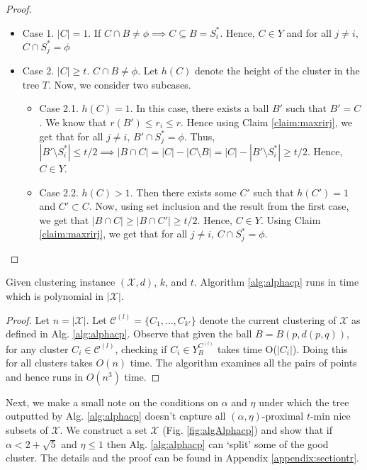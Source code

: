\documentclass[anon,12pt]{colt2016} %
\newcommand{\mc}{\mathcal}
\begin{document}
\begin{proof}
\begin{itemize}[nolistsep]
\item Case 1. $|C| = 1$. If $C \cap B \neq \phi \implies C \subseteq B = S_i^*$. Hence, $C \in Y$ and for all $j \neq i$, $C \cap S_j^* = \phi$

\item Case 2. $|C|\ge t$. $C \cap B \neq \phi$. Let $h(C)$ denote the height of the cluster in the tree $T$. Now, we consider two subcases.
\begin{itemize}
\renewcommand\labelitemii{$\circ$}
\item Case 2.1. $h(C) = 1$. In this case, there exists a ball $B'$ such that $B' = C$. We know that $r(B') \le r_i \le r$. Hence using Claim \ref{claim:maxrirj}, we get that for all $j \neq i$, $B' \cap S_j^* = \phi$. Thus, $|B'\setminus S_i^*| \le t/2 \implies |B\cap C| = |C| - |C\setminus B| = |C| - |B'\setminus S_i^*| \ge t/2$. Hence, $C \in Y$.

\item Case 2.2. $h(C) > 1$. Then there exists some $C'$ such that $h(C') = 1$ and $C' \subset C$. Now, using set inclusion and the result from the first case, we get that $|B\cap C| \ge |B\cap C'| \ge t/2$. Hence, $C \in Y$. Using Claim \ref{claim:maxrirj}, we get that for all $j \neq i$, $C \cap S_j^* = \phi$.
\end{itemize} 
\end{itemize}
\end{proof}

\begin{theorem}
\label{thm:algcptime}
Given clustering instance $(\mc X, d)$, $k$, and $t$. Algorithm \ref{alg:alphacp} runs in time which is polynomial in $|\mc X|$.
\end{theorem}

\begin{proof}
Let $n = |\mc X|$. Let $\mc C^{(l)} =\{C_1, \ldots, C_{k'}\}$ denote the current clustering of $\mc X$ as defined in Alg. \ref{alg:alphacp}. Observe that given the ball $B = B(p, d(p, q))$, for any cluster $C_i \in \mc C^{(l)}$, checking if $C_i \in Y_B^{C^{(l)}}$ takes time O($|C_i|$). Doing this for all clusters takes $O(n)$ time. The algorithm examines all the pairs of points and hence runs in $O(n^3)$ time.
\end{proof}

Next, we make a small note on the conditions on $\alpha$ and $\eta$ under which the tree outputted by Alg. \ref{alg:alphacp} doesn't capture all $(\alpha, \eta)$-proximal $t$-min nice subsets of $\mc X$. We construct a set $\mc X$ (Fig. \ref{fig:algAlphacp}) and show that if $\alpha < 2 + \sqrt{5}$ and $\eta \le 1$ then Alg. \ref{alg:alphacp} can `split' some of the good cluster. The details and the proof can be found in Appendix \ref{appendix:sectiontr}.
 
\end{document}
